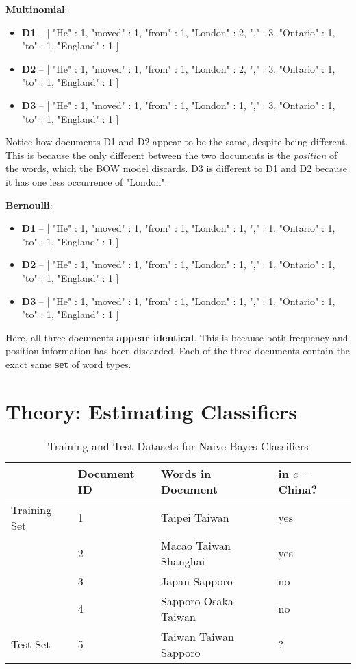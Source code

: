 \documentclass{article}
\begin{document}
\hspace{1pt}

\textbf{Multinomial}:
\begin{itemize}
	\item \textbf{D1} -- [ "He" : 1, "moved" : 1, "from" : 1, "London" : 2, "," : 3, "Ontario" : 1, "to" : 1, "England" : 1 ]
	\item \textbf{D2} -- [ "He" : 1, "moved" : 1, "from" : 1, "London" : 2, "," : 3, "Ontario" : 1, "to" : 1, "England" : 1 ]
	\item \textbf{D3} -- [ "He" : 1, "moved" : 1, "from" : 1, "London" : 1, "," : 3, "Ontario" : 1, "to" : 1, "England" : 1 ]
\end{itemize}
Notice how documents D1 and D2 appear to be the same, despite being different. This is because the only different between the two documents is  the \textit{position} of the words, which the BOW model discards. D3 is different to D1 and D2 because it has one less occurrence of "London".

\hspace{1pt}

\textbf{Bernoulli}:
\begin{itemize}
	\item \textbf{D1} -- [ "He" : 1, "moved" : 1, "from" : 1, "London" : 1, "," : 1, "Ontario" : 1, "to" : 1, "England" : 1 ]
	\item \textbf{D2} -- [ "He" : 1, "moved" : 1, "from" : 1, "London" : 1, "," : 1, "Ontario" : 1, "to" : 1, "England" : 1 ]
	\item \textbf{D3} -- [ "He" : 1, "moved" : 1, "from" : 1, "London" : 1, "," : 1, "Ontario" : 1, "to" : 1, "England" : 1 ]
\end{itemize}
Here, all three documents \textbf{appear identical}. This is because both frequency and position information has been discarded. Each of the three documents contain the exact same \textbf{set} of word types.

\section{Theory: Estimating Classifiers}

\begin{table}[h]
	\centering
	\begin{tabular}{|l|l|l|l|}
	\hline
	& \textbf{Document ID} & \textbf{Words in Document} & \textbf{in $c=$China?} \\
	\hline
	Training Set & 1 & Taipei Taiwan & yes \\
	& 2 & Macao Taiwan Shanghai & yes \\
	& 3 & Japan Sapporo & no \\
	& 4 & Sapporo Osaka Taiwan & no \\
	\hline
	Test Set & 5 & Taiwan Taiwan Sapporo & ? \\
	\hline 
	\end{tabular}
	\caption{Training and Test Datasets for Naive Bayes Classifiers}
	\label{tab:example_problem}
\end{table}
\end{document}
